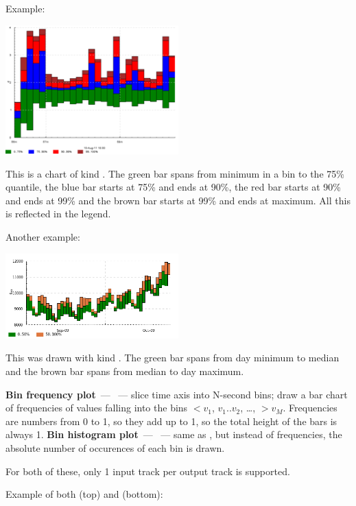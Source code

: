\documentclass{article}
\begin{document}
Example:

\centerline{\includegraphics[width=0.5\textwidth]{pics/tplot/tplot-rmq-latency-2.png}}

This is a chart of kind . The green bar spans from minimum in a bin to the 75\% quantile, the blue bar starts at 75\% and ends at 90\%, the red bar starts at 90\% and ends at 99\% and the brown bar starts at 99\% and ends at maximum. All this is reflected in the legend.

Another example:

\centerline{\includegraphics[width=0.5\textwidth]{pics/tplot/median.png}}

This was drawn with kind . The green bar spans from day minimum to median and the brown bar spans from median to day maximum.

\pagebreak
\noindent
\textbf{Bin frequency plot}~--- ~--- slice time axis into N-second bins; draw a bar chart of frequencies of values falling into the bins $<v_1$, $v_1..v_2$, \ldots, $>v_M$. Frequencies are numbers from 0 to 1, so they add up to 1, so the total height of the bars is always 1.
\noindent
\textbf{Bin histogram plot}~--- ~--- same as , but instead of frequencies, the absolute number of occurences of each bin is drawn.

For both of these, only 1 input track per output track is supported.

Example of both  (top) and  (bottom):
\end{document}

